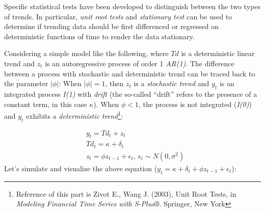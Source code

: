 \documentclass[
]{article}
\begin{document}
Specific statistical tests have been developed to distinguish between the two types of trends. In particular, \emph{unit root tests} and \emph{stationary test} can be used to determine if trending data should be first differenced or regressed on deterministic functions of time to render the data stationary.

Considering a simple model like the following, where \(Td\) is a deterministic linear trend and \(z_t\) is an autoregressive process of order 1 \emph{AR(1)}. The difference between a process with stochastic and deterministic trend can be traced back to the parameter \(|\phi|\): When \(|\phi| = 1\), then \(z_t\) is a \emph{stochastic trend} and \(y_t\) is an integrated process \emph{I(1)} with \emph{drift} (the so-called ``drift'' refers to the presence of a constant term, in this case \(\kappa\)). When \(\phi < 1\), the process is not integrated (\emph{I(0)}) and \(y_t\) exhibits a \emph{deterministic trend}\footnote{Reference of this part is Zivot E., Wang J. (2003), Unit Root Tests, in \emph{Modeling Financial Time Series with S-Plus®}. Springer, New York}:

\[
\begin{aligned} 
& y_t = Td_t + z_t \\
& Td_t = \kappa + \delta_t \\
& z_t = \phi z_{t-1} + \epsilon_t, \ \epsilon_t \sim N(0, \sigma^2)
\end{aligned} 
\]
Let's simulate and visualize the above equation (\(y_t = \kappa + \delta_t + \phi z_{t-1} + \epsilon_t\)):
\end{document}
